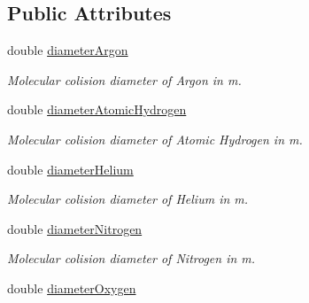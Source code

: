 \subsection*{Public Attributes}
\begin{DoxyCompactItemize}
\item 
double \hyperlink{structtudat_1_1aerodynamics_1_1GasComponentProperties_a0eee9fbfd1f12381cd6b61d39d723984}{diameter\+Argon}\hypertarget{structtudat_1_1aerodynamics_1_1GasComponentProperties_a0eee9fbfd1f12381cd6b61d39d723984}{}\label{structtudat_1_1aerodynamics_1_1GasComponentProperties_a0eee9fbfd1f12381cd6b61d39d723984}

\begin{DoxyCompactList}\small\item\em Molecular colision diameter of Argon in m. \end{DoxyCompactList}\item 
double \hyperlink{structtudat_1_1aerodynamics_1_1GasComponentProperties_a2f2c30831b4c4f9f428c06a0bbd719cd}{diameter\+Atomic\+Hydrogen}\hypertarget{structtudat_1_1aerodynamics_1_1GasComponentProperties_a2f2c30831b4c4f9f428c06a0bbd719cd}{}\label{structtudat_1_1aerodynamics_1_1GasComponentProperties_a2f2c30831b4c4f9f428c06a0bbd719cd}

\begin{DoxyCompactList}\small\item\em Molecular colision diameter of Atomic Hydrogen in m. \end{DoxyCompactList}\item 
double \hyperlink{structtudat_1_1aerodynamics_1_1GasComponentProperties_a79573f168694c923a87e460e457e0fc1}{diameter\+Helium}\hypertarget{structtudat_1_1aerodynamics_1_1GasComponentProperties_a79573f168694c923a87e460e457e0fc1}{}\label{structtudat_1_1aerodynamics_1_1GasComponentProperties_a79573f168694c923a87e460e457e0fc1}

\begin{DoxyCompactList}\small\item\em Molecular colision diameter of Helium in m. \end{DoxyCompactList}\item 
double \hyperlink{structtudat_1_1aerodynamics_1_1GasComponentProperties_abce48f267ef9b7c04734576ab6215897}{diameter\+Nitrogen}\hypertarget{structtudat_1_1aerodynamics_1_1GasComponentProperties_abce48f267ef9b7c04734576ab6215897}{}\label{structtudat_1_1aerodynamics_1_1GasComponentProperties_abce48f267ef9b7c04734576ab6215897}

\begin{DoxyCompactList}\small\item\em Molecular colision diameter of Nitrogen in m. \end{DoxyCompactList}\item 
double \hyperlink{structtudat_1_1aerodynamics_1_1GasComponentProperties_a44852bf0481e6121bf7496bfcd446572}{diameter\+Oxygen}\hypertarget{structtudat_1_1aerodynamics_1_1GasComponentProperties_a44852bf0481e6121bf7496bfcd446572}{}\label{structtudat_1_1aerodynamics_1_1GasComponentProperties_a44852bf0481e6121bf7496bfcd446572}


\end{DoxyCompactItemize}
